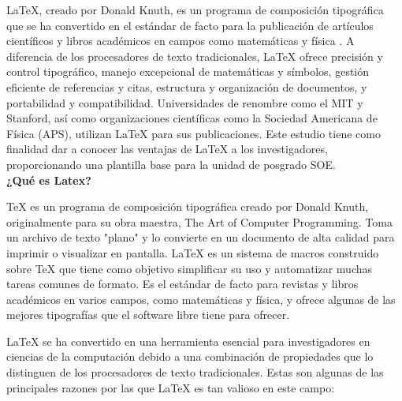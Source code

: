 \documentclass[10pt]{article}
\begin{document}
LaTeX, creado por Donald Knuth, es un programa de composición tipográfica que se ha convertido en el estándar de facto para la publicación de artículos científicos y libros académicos en campos como matemáticas y física \cite{knuth1997art}. 
A diferencia de los procesadores de texto tradicionales, LaTeX ofrece precisión y control tipográfico, manejo excepcional de matemáticas y símbolos, gestión eficiente de referencias y citas, estructura y organización de documentos, y portabilidad y compatibilidad. 
Universidades de renombre como el MIT y Stanford, así como organizaciones científicas como la Sociedad Americana de Física (APS), utilizan LaTeX para sus publicaciones. Este estudio tiene como finalidad dar a conocer las ventajas de LaTeX a los investigadores, proporcionando una plantilla base para la unidad de posgrado SOE.\\
\textbf{¿Qué es Latex?}

TeX es un programa de composición tipográfica creado por Donald Knuth, originalmente para su obra maestra, The Art of Computer Programming. Toma un archivo de texto "plano" y lo convierte en un documento de alta calidad para imprimir o visualizar en pantalla. LaTeX es un sistema de macros construido sobre TeX que tiene como objetivo simplificar su uso y automatizar muchas tareas comunes de formato. Es el estándar de facto para revistas y libros académicos en varios campos, como matemáticas y física, y ofrece algunas de las mejores tipografías que el software libre tiene para ofrecer.

LaTeX se ha convertido en una herramienta esencial para investigadores en ciencias de la computación debido a una combinación de propiedades que lo distinguen de los procesadores de texto tradicionales. Estas son algunas de las principales razones por las que LaTeX es tan valioso en este campo:
\end{document}
